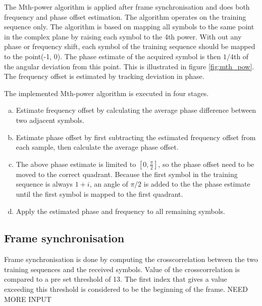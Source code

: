 The Mth-power algorithm is applied after frame synchronisation and does both frequency and phase offset estimation. The algorithm operates on the training sequence only. The algorithm is based on mapping all symbols to the same point in the complex plane by raising each symbol to the 4th power. With out any phase or frequency shift, each symbol of the training sequence should be mapped to the point(-1, 0). The phase estimate of the acquired symbol is then $1/4$th of the angular deviation from this point. This is illustrated in figure \ref{fig:mth_pow}. The frequency offset is estimated by tracking deviation in phase. 

The implemented Mth-power algorithm is executed in four stages. 
\begin{enumerate}[a)]
\item
Estimate frequency offset by calculating the average phase difference between two adjacent symbols. 

\item
Estimate phase offset by first subtracting the estimated frequency offset from each sample, then calculate the average phase offset.

\item
The above phase estimate is limited to $[0, \frac{\pi}{2}]$, so the phase offset need to be moved to the correct quadrant. Because the first symbol in the training sequence is always $1+i$, an angle of $\pi/2$ is added to the the phase estimate until the first symbol is mapped to the first quadrant. 

\item
Apply the estimated phase and frequency to all remaining symbols. 
\end{enumerate}

\subsection{Frame synchronisation}
Frame synchronisation is done by computing the crosscorrelation between the two training sequences and the received symbols. Value of the crosscorrelation is compared to a pre set threshold of 13. The first index that gives a value exceeding this threshold is considered to be the beginning of the frame. 
NEED MORE INPUT





